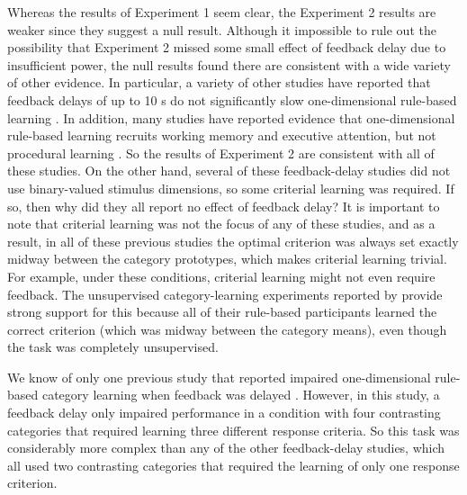 \documentclass[doc, floatsintext]{apa7}
\begin{document}
Whereas the results of Experiment 1 seem clear, the
Experiment 2 results are weaker since they suggest a null
result. Although it impossible to rule out the possibility
that Experiment 2 missed some small effect of feedback delay
due to insufficient power, the null results found there are
consistent with a wide variety of other evidence. In
particular, a variety of other studies have reported that
feedback delays of up to 10 s do not significantly slow
one-dimensional rule-based learning \parencite{DunnEtAl2012,
    ell2009critrial, MaddoxAshbyBohil2003, MaddoxIng2005,
Worthyetal2013}. In addition, many studies have reported
evidence that one-dimensional rule-based learning recruits
working memory and executive attention, but not procedural
learning \parencite[for reviews, see,
e.g.,][]{AshbySmithRosedahl2020, AshbyValentin2017}. So the
results of Experiment 2 are consistent with all of these
studies. On the other hand, several of these feedback-delay
studies did not use binary-valued stimulus dimensions, so
some criterial learning was required. If so, then why did
they all report no effect of feedback delay? It is important
to note that criterial learning was not the focus of any of
these studies, and as a result, in all of these previous
studies the optimal criterion was always set exactly midway
between the category prototypes, which makes criterial
learning trivial. For example, under these conditions,
criterial learning might not even require feedback. The
unsupervised category-learning experiments reported by
\textcite{ashby1999dominance} provide strong support for
this because all of their rule-based participants learned
the correct criterion (which was midway between the category
means), even though the task was completely unsupervised.

We know of only one previous study that reported impaired
one-dimensional rule-based category learning when feedback
was delayed \parencite{ell2009critrial}. However, in this
study, a feedback delay only impaired performance in a
condition with four contrasting categories that required
learning three different response criteria. So this task was
considerably more complex than any of the other
feedback-delay studies, which all used two contrasting
categories that required the learning of only one response
criterion. 
\end{document}

